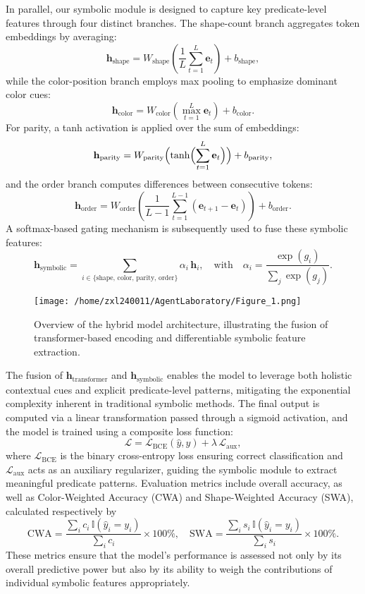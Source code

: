 \documentclass{article}
\begin{document}
In parallel, our symbolic module is designed to capture key predicate-level features through four distinct branches. The shape-count branch aggregates token embeddings by averaging:
\[
\mathbf{h}_{\text{shape}} = W_{\text{shape}}\left(\frac{1}{L}\sum_{t=1}^{L}\mathbf{e}_t\right)+b_{\text{shape}},
\]
while the color-position branch employs max pooling to emphasize dominant color cues:
\[
\mathbf{h}_{\text{color}} = W_{\text{color}}\left(\max_{t=1}^{L}\mathbf{e}_t\right)+b_{\text{color}}.
\]
For parity, a tanh activation is applied over the sum of embeddings:
\[
\mathbf{h}_{\text{parity}} = W_{\text{parity}}\Bigl(\tanh\Bigl(\sum_{t=1}^{L}\mathbf{e}_t\Bigr)\Bigr)+b_{\text{parity}},
\]
and the order branch computes differences between consecutive tokens:
\[
\mathbf{h}_{\text{order}} = W_{\text{order}}\left(\frac{1}{L-1}\sum_{t=1}^{L-1}\left(\mathbf{e}_{t+1}-\mathbf{e}_{t}\right)\right)+b_{\text{order}}.
\]
A softmax-based gating mechanism is subsequently used to fuse these symbolic features:
\[
\mathbf{h}_{\text{symbolic}} = \sum_{i\in\{\text{shape, color, parity, order}\}} \alpha_i\, \mathbf{h}_i,\quad \text{with}\quad \alpha_i = \frac{\exp(g_i)}{\sum_j \exp(g_j)}.
\]

\begin{figure}[h]
\caption{Overview of the hybrid model architecture, illustrating the fusion of transformer-based encoding and differentiable symbolic feature extraction.}
\centering
\texttt{[image: /home/zxl240011/AgentLaboratory/Figure\_1.png]}
\label{fig:fig1}
\end{figure}

The fusion of \(\mathbf{h}_{\text{transformer}}\) and \(\mathbf{h}_{\text{symbolic}}\) enables the model to leverage both holistic contextual cues and explicit predicate-level patterns, mitigating the exponential complexity inherent in traditional symbolic methods. The final output is computed via a linear transformation passed through a sigmoid activation, and the model is trained using a composite loss function:
\[
\mathcal{L} = \mathcal{L}_{\text{BCE}}(\hat{y}, y) + \lambda\, \mathcal{L}_{\text{aux}},
\]
where \(\mathcal{L}_{\text{BCE}}\) is the binary cross-entropy loss ensuring correct classification and \(\mathcal{L}_{\text{aux}}\) acts as an auxiliary regularizer, guiding the symbolic module to extract meaningful predicate patterns. Evaluation metrics include overall accuracy, as well as Color-Weighted Accuracy (CWA) and Shape-Weighted Accuracy (SWA), calculated respectively by
\[
\text{CWA} = \frac{\sum_{i} c_i\, \mathbb{I}(\hat{y}_i=y_i)}{\sum_{i} c_i}\times 100\%, \quad \text{SWA} = \frac{\sum_{i} s_i\, \mathbb{I}(\hat{y}_i=y_i)}{\sum_{i} s_i}\times 100\%.
\]
These metrics ensure that the model’s performance is assessed not only by its overall predictive power but also by its ability to weigh the contributions of individual symbolic features appropriately.
\end{document}
